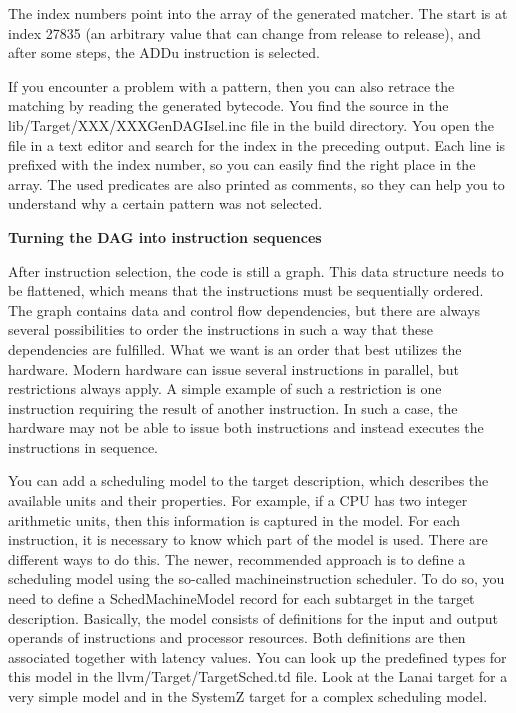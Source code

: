 The index numbers point into the array of the generated matcher. The start is at index 27835 (an arbitrary value that can change from release to release), and after some steps, the ADDu instruction is selected.\par

\begin{tcolorbox}[colback=blue!5!white,colframe=blue!75!black, title=Following the pattern matching]
If you encounter a problem with a pattern, then you can also retrace the matching by reading the generated bytecode. You find the source in the lib/Target/XXX/XXXGenDAGIsel.inc file in the build directory. You open the file in a text editor and search for the index in the preceding output. Each line is prefixed with the index number, so you can easily find the right place in the array. The used predicates are also printed as comments, so they can help you to understand why a certain pattern was not selected.
\end{tcolorbox}

\hspace*{\fill} \par %
\textbf{Turning the DAG into instruction sequences}

After instruction selection, the code is still a graph. This data structure needs to be flattened, which means that the instructions must be sequentially ordered. The graph contains data and control flow dependencies, but there are always several possibilities to order the instructions in such a way that these dependencies are fulfilled. What we want is an order that best utilizes the hardware. Modern hardware can issue several instructions in parallel, but restrictions always apply. A simple example of such a restriction is one instruction requiring the result of another instruction. In such a case, the hardware may not be able to issue both instructions and instead executes the instructions in sequence.\par

You can add a scheduling model to the target description, which describes the available units and their properties. For example, if a CPU has two integer arithmetic units, then this information is captured in the model. For each instruction, it is necessary to know which part of the model is used. There are different ways to do this. The newer, recommended approach is to define a scheduling model using the so-called machineinstruction scheduler. To do so, you need to define a SchedMachineModel record for each subtarget in the target description. Basically, the model consists of definitions for the input and output operands of instructions and processor resources. Both definitions are then associated together with latency values. You can look up the predefined types for this model in the llvm/Target/TargetSched.td file. Look at the Lanai target for a very simple model and in the SystemZ target for a complex scheduling model.\par

